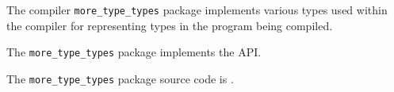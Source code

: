 
The compiler {\tt more\_type\_types} package implements various types used within 
the compiler for representing types in the program being compiled.

The {\tt more\_type\_types} package implements the  API.

The {\tt more\_type\_types} package source code is .



